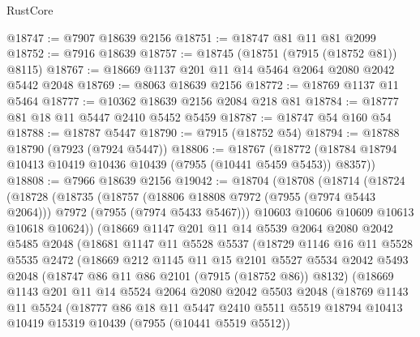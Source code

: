 \begin{lexlean}{RustCore}
\begin{coremodule}
@18747 := @7907 @18639 @2156
@18751 := @18747 @81 @11 @81 @2099
@18752 := @7916 @18639
@18757 := @18745 (@18751 (@7915 (@18752 @81)) @8115)
@18767 := @18669 @1137 @201 @11 @14 @5464 @2064 @2080 @2042 @5442 @2048
@18769 := @8063 @18639 @2156
@18772 := @18769 @1137 @11 @5464
@18777 := @10362 @18639 @2156 @2084 @218 @81
@18784 := @18777 @81 @18 @11 @5447 @2410 @5452 @5459
@18787 := @18747 @54 @160 @54
@18788 := @18787 @5447
@18790 := @7915 (@18752 @54)
@18794 := @18788 @18790 (@7923 (@7924 @5447))
@18806 := @18767
    (@18772 (@18784 @18794 @10413 @10419 @10436 @10439 (@7955 (@10441 @5459 @5453)) @8357))
@18808 := @7966 @18639 @2156
@19042 := @18704
    (@18708
      (@18714
        (@18724
          (@18728
            (@18735
              (@18757
                (@18806 @18808 @7972 (@7955 (@7974 @5443 @2064)))
                @7972
                (@7955 (@7974 @5433 @5467)))
              @10603
              @10606
              @10609
              @10613
              @10618
              @10624))
          (@18669
            @1147
            @201
            @11
            @14
            @5539
            @2064
            @2080
            @2042
            @5485
            @2048
            (@18681
              @1147
              @11
              @5528
              @5537
              (@18729
                @1146
                @16
                @11
                @5528
                @5535
                @2472
                (@18669
                  @212
                  @1145
                  @11
                  @15
                  @2101
                  @5527
                  @5534
                  @2042
                  @5493
                  @2048
                  (@18747 @86 @11 @86 @2101 (@7915 (@18752 @86)) @8132)
                  (@18669
                    @1143
                    @201
                    @11
                    @14
                    @5524
                    @2064
                    @2080
                    @2042
                    @5503
                    @2048
                    (@18769
                      @1143
                      @11
                      @5524
                      (@18777
                        @86
                        @18
                        @11
                        @5447
                        @2410
                        @5511
                        @5519
                        @18794
                        @10413
                        @10419
                        @15319
                        @10439
                        (@7955 (@10441 @5519 @5512))

\end{coremodule}
\end{lexlean}
